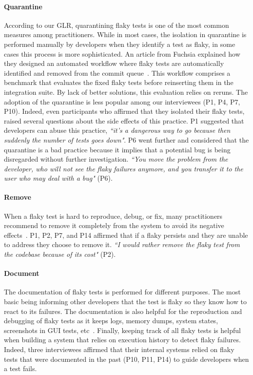\paragraph{\textbf{Quarantine}}
According to our GLR, quarantining flaky tests is one of the most common measures among practitioners.
While in most cases, the isolation in quarantine is performed manually by developers when they identify a test as flaky, in some cases this process is more sophisticated.
An article from Fuchsia explained how they designed an automated workflow where flaky tests are automatically identified and removed from the commit queue~\cite{Flakytes54:online}.
This workflow comprises a benchmark that evaluates the fixed flaky tests before reinserting them in the integration suite.
By lack of better solutions, this evaluation relies on reruns.
The adoption of the quarantine is less popular among our interviewees (P1, P4, P7, P10).
Indeed, even participants who affirmed that they isolated their flaky tests, raised several questions about the side effects of this practice.
P1 suggested that developers can abuse this practice, \textit{``it's a dangerous way to go because then suddenly the number of tests goes down"}.
P6 went further and considered that the quarantine is a bad practice because it implies that a potential bug is being disregarded without further investigation.
\textit{``You move the problem from the developer, who will not see the flaky failures anymore, and you transfer it to the user who may deal with a bug"} (P6).
\paragraph{\textbf{Remove}}
When a flaky test is hard to reproduce, debug, or fix, many practitioners recommend to remove it completely from the system to avoid its negative effects~\cite{Flakytes54:online,FlakyTes82:online,ThinkLik1:online}.
P1, P2, P7, and P14 affirmed that if a flaky persists and they are unable to address they choose to remove it.
\textit{``I would rather remove the flaky test from the codebase because of its cost"} (P2).


\paragraph{\textbf{Document}}
The documentation of flaky tests is performed for different purposes.
The most basic being informing other developers that the test is flaky so they know how to react to its failures.
The documentation is also helpful for the reproduction and debugging of flaky tests as it keeps logs, memory dumps, system states, screenshots in GUI tests, etc~\cite{flakytes70:online}.
Finally, keeping track of all flaky tests is helpful when building a system that relies on execution history to detect flaky failures.
Indeed, three interviewees affirmed that their internal systems relied on flaky tests that were documented in the past (P10, P11, P14) to guide developers when a test fails.

